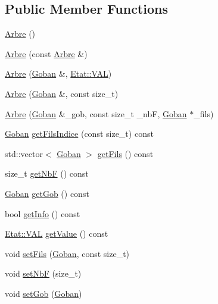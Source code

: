 \subsection*{Public Member Functions}
\begin{DoxyCompactItemize}
\item 
\hyperlink{class_arbre_a761f4a2c6a43f44b38d4ac6fc1cf5cae}{Arbre} ()
\item 
\hyperlink{class_arbre_a3284c47c1ea92a6c5be4a210008dfb4f}{Arbre} (const \hyperlink{class_arbre}{Arbre} \&)
\item 
\hyperlink{class_arbre_ac82e543d8cbf0aced4d741c346f9950d}{Arbre} (\hyperlink{class_goban}{Goban} \&, \hyperlink{class_etat_af3ddb2296ffc379b7f3ad2bf832f294e}{Etat\+::\+V\+AL})
\item 
\hyperlink{class_arbre_acaa1b2ef290ae35e414d6fc5510c9e6e}{Arbre} (\hyperlink{class_goban}{Goban} \&, const size\+\_\+t)
\item 
\hyperlink{class_arbre_a7be58ac146487307f93a5c141f3546df}{Arbre} (\hyperlink{class_goban}{Goban} \&\+\_\+gob, const size\+\_\+t \+\_\+nbF, \hyperlink{class_goban}{Goban} $\ast$\+\_\+fils)
\item 
\hyperlink{class_goban}{Goban} \hyperlink{class_arbre_a46ec1d0b89a9466c87a31e8e43133099}{get\+Fils\+Indice} (const size\+\_\+t) const
\item 
std\+::vector$<$ \hyperlink{class_goban}{Goban} $>$ \hyperlink{class_arbre_ace487e80301c07e6369108bf9a480513}{get\+Fils} () const
\item 
size\+\_\+t \hyperlink{class_arbre_a0aef1f091d76bca13229a21fcd45a076}{get\+NbF} () const
\item 
\hyperlink{class_goban}{Goban} \hyperlink{class_arbre_abb30fa37b209f6e148a5dc29e3a1c00d}{get\+Gob} () const
\item 
bool \hyperlink{class_arbre_afc71a182e86352b06193c2dc746fab79}{get\+Info} () const
\item 
\hyperlink{class_etat_af3ddb2296ffc379b7f3ad2bf832f294e}{Etat\+::\+V\+AL} \hyperlink{class_arbre_aeaa93d0b192e3cce04adb509b6b29c40}{get\+Value} () const
\item 
void \hyperlink{class_arbre_ad7db2ec4bca90d9523c9dab19eadd628}{set\+Fils} (\hyperlink{class_goban}{Goban}, const size\+\_\+t)
\item 
void \hyperlink{class_arbre_acabc45692262e5ca9c2f7b410ddcd373}{set\+NbF} (size\+\_\+t)
\item 
void \hyperlink{class_arbre_a36267e74d40f509fd63b99fe6d8dae0b}{set\+Gob} (\hyperlink{class_goban}{Goban})
\item 

\end{DoxyCompactItemize}
